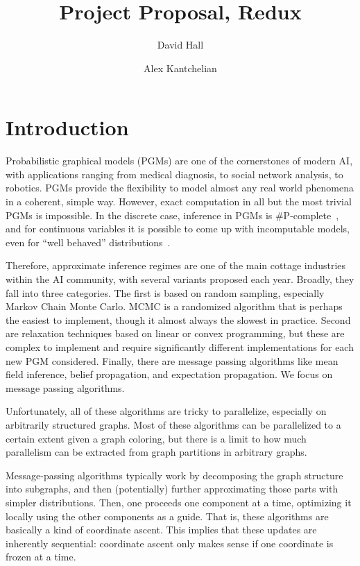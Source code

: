 \documentclass[12pt,leqno,twoside]{article}
\title{Project Proposal, Redux}
\author{David Hall \and Alex Kantchelian}
\begin{document}
\maketitle

\section{Introduction}

Probabilistic graphical models (PGMs) are one of the cornerstones
of modern AI, with applications ranging from medical diagnosis, to
social network analysis, to robotics. PGMs provide the flexibility
to model almost any real world phenomena in a coherent, simple way.
However, exact computation in all but the most trivial PGMs is
impossible. In the discrete case, inference in PGMs is
\#P-complete~\citep{Koller2009pgm}, and for continuous variables it is
possible to come up with incomputable models, even for ``well
behaved'' distributions~\citep{AFR11}.

Therefore, approximate inference regimes are one of the main cottage
industries within the AI community, with several variants proposed
each year. Broadly, they fall into three categories. The first is
based on random sampling, especially Markov Chain Monte Carlo. MCMC
is a randomized algorithm that is perhaps the easiest to implement, though
it almost always the slowest in practice. Second are relaxation techniques
based on linear or convex programming, but these are complex to implement
and require significantly different implementations for each new PGM
considered. Finally, there are message passing algorithms
like mean field inference, belief propagation, and expectation propagation.
We focus on message passing algorithms.

Unfortunately, all of these algorithms are tricky to parallelize, especially on
arbitrarily structured graphs. Most of these algorithms can be
parallelized to a certain extent given a graph coloring, but there
is a limit to how much parallelism can be extracted from graph
partitions in arbitrary graphs.

Message-passing algorithms typically work by decomposing the graph
structure into subgraphs, and then (potentially) further approximating
those parts with simpler distributions. Then, one proceeds one
component at a time, optimizing it locally using the other components
as a guide. That is, these algorithms are basically a kind of
coordinate ascent. This implies that these updates are inherently
sequential: coordinate ascent only makes sense if one coordinate is frozen at a time. 
\end{document}
